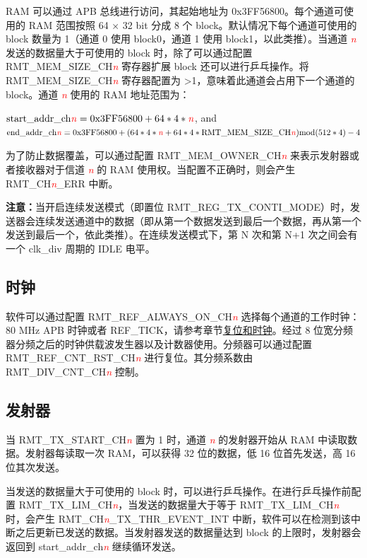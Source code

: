 \documentclass[main\_\_CN.tex]{subfiles}
\begin{document}
RAM 可以通过 APB 总线进行访问，其起始地址为 0x3FF56800。每个通道可使用的 RAM 范围按照 64 × 32 bit 分成 8 个 block。默认情况下每个通道可使用的 block 数量为 1（通道 0 使用 block0，通道 1 使用 block1，以此类推）。当通道 \textcolor{red}{\it{n}} 发送的数据量大于可使用的 block 时，除了可以通过配置 RMT\_MEM\_SIZE\_CH\textcolor{red}{\it{n}} 寄存器扩展 block 还可以进行乒乓操作。将 RMT\_MEM\_SIZE\_CH\textcolor{red}{\it{n}} 寄存器配置为 >1，意味着此通道会占用下一个通道的 block。通道 \textcolor{red}{\it{n}} 使用的 RAM 地址范围为：

$ \textrm{start\_addr\_ch}\textcolor{red}{\it{n}} = \textrm{0x3FF56800} + 64*4*\textcolor{red}{\it{n}}$\textrm{,   and} \\
$ \textrm{end\_addr\_ch}\textcolor{red}{\it{n}} = \textrm{0x3FF56800} + (64*4*\textcolor{red}{\it{n}}+64*4*\textrm{RMT\_MEM\_SIZE\_CH}\textcolor{red}{\it{n}})\textrm{mod}(512*4)-4 $

为了防止数据覆盖，可以通过配置 RMT\_MEM\_OWNER\_CH\textcolor{red}{\it{n}} 来表示发射器或者接收器对于信道 \textcolor{red}{\it{n}} 的 RAM 使用权。当配置不正确时，则会产生 RMT\_CH\textcolor{red}{\it{n}}\_ERR 中断。

{\bfseries 注意：}当开启连续发送模式（即置位 RMT\_REG\_TX\_CONTI\_MODE）时，发送器会连续发送通道中的数据（即从第一个数据发送到最后一个数据，再从第一个发送到最后一个，依此类推）。在连续发送模式下，第 N 次和第 N+1 次之间会有一个 clk\_div 周期的 IDLE 电平。

\subsection{时钟}
软件可以通过配置 RMT\_REF\_ALWAYS\_ON\_CH\textcolor{red}{\it{n}} 选择每个通道的工作时钟：80 MHz APB 时钟或者 REF\_TICK，请参考章节\hyperref[mod:resclk]{复位和时钟}。经过 8 位宽分频器分频之后的时钟供载波发生器以及计数器使用。分频器可以通过配置 RMT\_REF\_CNT\_RST\_CH\textcolor{red}{\it{n}} 进行复位。其分频系数由 RMT\_DIV\_CNT\_CH\textcolor{red}{\it{n}} 控制。

\subsection{发射器}\label{rmt:transmitter}
当 RMT\_TX\_START\_CH\textcolor{red}{\it{n}} 置为 1 时，通道 \textcolor{red}{\it{n}} 的发射器开始从 RAM 中读取数据。发射器每读取一次 RAM，可以获得 32 位的数据，低 16 位首先发送，高 16 位其次发送。

当发送的数据量大于可使用的 block 时，可以进行乒乓操作。在进行乒乓操作前配置 RMT\_TX\_LIM\_CH\textcolor{red}{\it{n}}，当发送的数据量大于等于 RMT\_TX\_LIM\_CH\textcolor{red}{\it{n}} 时，会产生 RMT\_CH\textcolor{red}{\it{n}}\_TX\_THR\_EVENT\_INT 中断，软件可以在检测到该中断之后更新已发送的数据。当发射器发送的数据量达到 block 的上限时，发射器会返回到 start\_addr\_ch\textcolor{red}{\it{n}} 继续循环发送。
\end{document}
